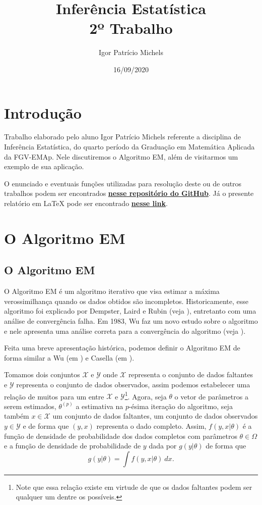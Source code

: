 \documentclass{article}
\title{Inferência Estatística \\ 2º Trabalho}
\author{Igor Patrício Michels}
\date{16/09/2020}
\begin{document}
\maketitle

\section*{Introdução}

Trabalho elaborado pelo aluno Igor Patrício Michels referente a disciplina de Inferência Estatística, do quarto período da Graduação em Matemática Aplicada da FGV-EMAp. Nele discutiremos o Algoritmo EM, além de visitarmos um exemplo de sua aplicação.

O enunciado e eventuais funções utilizadas para resolução deste ou de outros trabalhos podem ser encontrados \href{https://github.com/IgorMichels/Statistical_Inference}{\textbf{nesse repositório do GitHub}}. Já o presente relatório em \LaTeX{} pode ser encontrado \href{https://www.overleaf.com/read/sdfnbcnthrms}{\textbf{nesse link}}.

\section*{O Algoritmo EM}

\subsection*{O Algoritmo EM}

O Algoritmo EM é um algoritmo iterativo que visa estimar a máxima verossimilhança quando os dados obtidos são incompletos. Historicamente, esse algoritmo foi explicado por Dempster, Laird e Rubin (veja \cite{10.2307/2984875}), entretanto com uma análise de convergência falha. Em 1983, Wu faz um novo estudo sobre o algoritmo e nele apresenta uma análise correta para a convergência do algoritmo (veja \cite{wu1983}).

Feita uma breve apresentação histórica, podemos definir o Algoritmo EM de forma similar a Wu (em \cite{wu1983}) e Casella (em \cite{casella}).

Tomamos dois conjuntos $\mathscr{X}$ e $\mathscr{Y}$ onde $\mathscr{X}$ representa o conjunto de dados faltantes e $\mathscr{Y}$ representa o conjunto de dados observados, assim podemos estabelecer uma relação de muitos para um entre $\mathscr{X}$ e $\mathscr{Y}$\footnote{Note que essa relação existe em virtude de que os dados faltantes podem ser qualquer um dentre os possíveis.}. Agora, seja $\theta$ o vetor de parâmetros a serem estimados, $\theta^{(p)}$ a estimativa na $p$-ésima iteração do algoritmo, seja também $x \in \mathscr{X}$ um conjunto de dados faltantes, um conjunto de dados observados $y \in \mathscr{Y}$ e de forma que $(y, x)$ representa o dado completo. Assim, $f(y, x | \theta)$ é a função de densidade de probabilidade dos dados completos com parâmetros $\theta \in \Omega$ e a função de densidade de probabilidade de $y$ dada por $g(y | \theta)$ de forma que
\[g(y | \theta) = \int f(y, x | \theta) ~dx.\]
\end{document}
